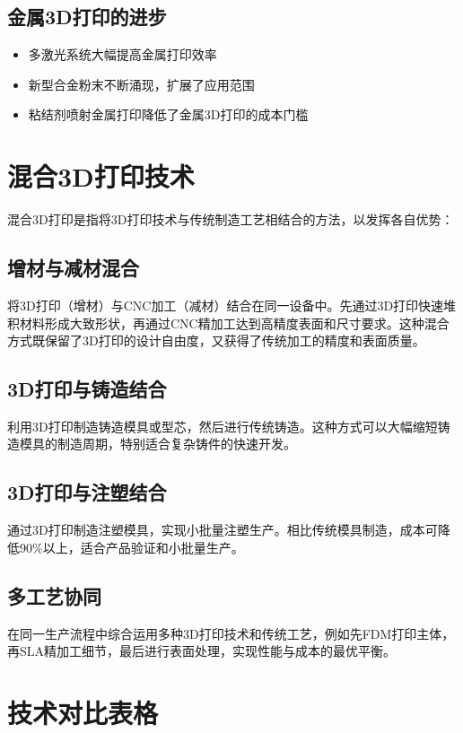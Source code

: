 \documentclass[12pt,UTF8]{ctexbook}
\begin{document}
\subsection{金属3D打印的进步}
\begin{itemize}
\item 多激光系统大幅提高金属打印效率
\item 新型合金粉末不断涌现，扩展了应用范围
\item 粘结剂喷射金属打印降低了金属3D打印的成本门槛
\end{itemize}

\section{混合3D打印技术}

混合3D打印是指将3D打印技术与传统制造工艺相结合的方法，以发挥各自优势：

\subsection{增材与减材混合}
将3D打印（增材）与CNC加工（减材）结合在同一设备中。先通过3D打印快速堆积材料形成大致形状，再通过CNC精加工达到高精度表面和尺寸要求。这种混合方式既保留了3D打印的设计自由度，又获得了传统加工的精度和表面质量。

\subsection{3D打印与铸造结合}
利用3D打印制造铸造模具或型芯，然后进行传统铸造。这种方式可以大幅缩短铸造模具的制造周期，特别适合复杂铸件的快速开发。

\subsection{3D打印与注塑结合}
通过3D打印制造注塑模具，实现小批量注塑生产。相比传统模具制造，成本可降低90\%以上，适合产品验证和小批量生产。

\subsection{多工艺协同}
在同一生产流程中综合运用多种3D打印技术和传统工艺，例如先FDM打印主体，再SLA精加工细节，最后进行表面处理，实现性能与成本的最优平衡。

\section{技术对比表格}
\end{document}
